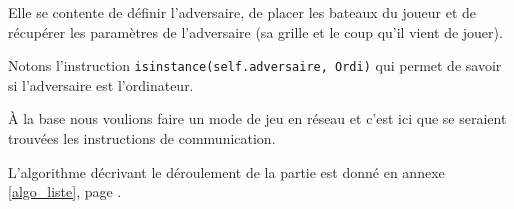 Elle se contente de définir l'adversaire, de placer les bateaux du joueur et de récupérer les paramètres de l'adversaire (sa grille et le coup qu'il vient de jouer).

Notons l'instruction \texttt{isinstance(self.adversaire, Ordi)} qui permet de savoir si l'adversaire est l'ordinateur.

\medskip

À la base nous voulions faire un mode de jeu en réseau et c'est ici que se seraient trouvées les instructions de communication.

\medskip

L'algorithme décrivant le déroulement de la partie est donné en annexe \ref{algo_liste}, page \pageref{algo_partie}.

%
